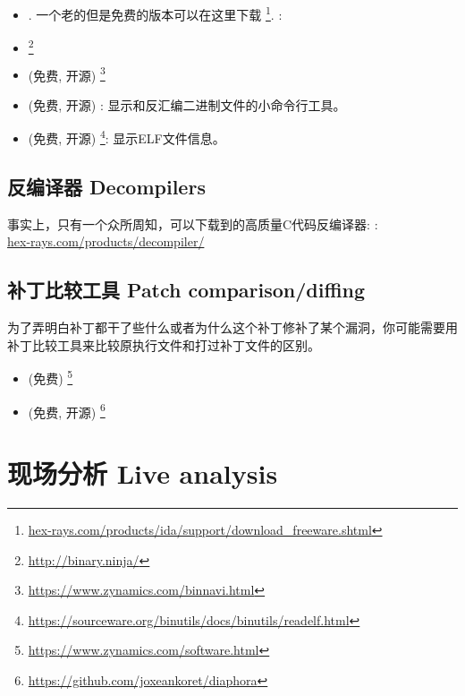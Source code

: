 \documentclass[UTF8,nofonts]{ctexart}
\begin{document}

\begin{itemize}
\item {}. 一个老的但是免费的版本可以在这里下载
\footnote{\href{http://go.yurichev.com/17031}{hex-rays.com/products/ida/support/download\_freeware.shtml}}.
\ShortHotKeyCheatsheet: 

\item {}\footnote{\url{http://binary.ninja/}}

\item (免费, 开源) \footnote{\url{https://www.zynamics.com/binnavi.html}}

\item (免费, 开源) : 显示和反汇编二进制文件的小命令行工具。

\item (免费, 开源) \footnote{\url{https://sourceware.org/binutils/docs/binutils/readelf.html}}:
显示ELF文件信息。
\end{itemize}

\subsection{反编译器 Decompilers}

事实上，只有一个众所周知，可以下载到的高质量C代码反编译器: :\\
\href{http://go.yurichev.com/17033}{hex-rays.com/products/decompiler/}

\subsection{补丁比较工具 Patch comparison/diffing}

为了弄明白补丁都干了些什么或者为什么这个补丁修补了某个漏洞，你可能需要用补丁比较工具来比较原执行文件和打过补丁文件的区别。

\begin{itemize}
\item (免费) \footnote{\url{https://www.zynamics.com/software.html}}

\item (免费, 开源) \footnote{\url{https://github.com/joxeankoret/diaphora}}
\end{itemize}

\section{现场分析 Live analysis}
\end{document}
